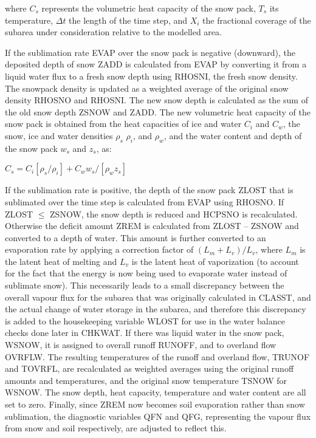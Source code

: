 where $C_s$ represents the volumetric heat capacity of the snow pack, $T_s$ its temperature, $\Delta t$ the length of the time step, and $X_i$ the fractional coverage of the subarea under consideration relative to the modelled area.

If the sublimation rate E\+V\+A\+P over the snow pack is negative (downward), the deposited depth of snow Z\+A\+D\+D is calculated from E\+V\+A\+P by converting it from a liquid water flux to a fresh snow depth using R\+H\+O\+S\+N\+I, the fresh snow density. The snowpack density is updated as a weighted average of the original snow density R\+H\+O\+S\+N\+O and R\+H\+O\+S\+N\+I. The new snow depth is calculated as the sum of the old snow depth Z\+S\+N\+O\+W and Z\+A\+D\+D. The new volumetric heat capacity of the snow pack is obtained from the heat capacities of ice and water $C_i$ and $C_w$, the snow, ice and water densities $\rho_s$ $\rho_i$, and $\rho_w$, and the water content and depth of the snow pack $w_s$ and $z_s$, as\+:

$C_s = C_i [\rho_s / \rho_i ] + C_w w_s /[\rho_w z_s]$

If the sublimation rate is positive, the depth of the snow pack Z\+L\+O\+S\+T that is sublimated over the time step is calculated from E\+V\+A\+P using R\+H\+O\+S\+N\+O. If Z\+L\+O\+S\+T $\leq$ Z\+S\+N\+O\+W, the snow depth is reduced and H\+C\+P\+S\+N\+O is recalculated. Otherwise the deficit amount Z\+R\+E\+M is calculated from Z\+L\+O\+S\+T – Z\+S\+N\+O\+W and converted to a depth of water. This amount is further converted to an evaporation rate by applying a correction factor of $(L_m+ L_v)/L_v$, where $L_m$ is the latent heat of melting and $L_v$ is the latent heat of vaporization (to account for the fact that the energy is now being used to evaporate water instead of sublimate snow). This necessarily leads to a small discrepancy between the overall vapour flux for the subarea that was originally calculated in C\+L\+A\+S\+S\+T, and the actual change of water storage in the subarea, and therefore this discrepancy is added to the housekeeping variable W\+L\+O\+S\+T for use in the water balance checks done later in C\+H\+K\+W\+A\+T. If there was liquid water in the snow pack, W\+S\+N\+O\+W, it is assigned to overall runoff R\+U\+N\+O\+F\+F, and to overland flow O\+V\+R\+F\+L\+W. The resulting temperatures of the runoff and overland flow, T\+R\+U\+N\+O\+F and T\+O\+V\+R\+F\+L, are recalculated as weighted averages using the original runoff amounts and temperatures, and the original snow temperature T\+S\+N\+O\+W for W\+S\+N\+O\+W. The snow depth, heat capacity, temperature and water content are all set to zero. Finally, since Z\+R\+E\+M now becomes soil evaporation rather than snow sublimation, the diagnostic variables Q\+F\+N and Q\+F\+G, representing the vapour flux from snow and soil respectively, are adjusted to reflect this.